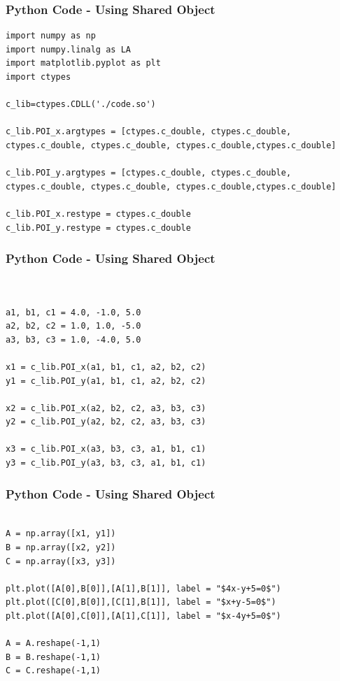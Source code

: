 \documentclass{beamer}
\begin{document}
\begin{frame}[fragile]
    \frametitle{Python Code - Using Shared Object}
    \begin{lstlisting}
import numpy as np
import numpy.linalg as LA
import matplotlib.pyplot as plt
import ctypes

c_lib=ctypes.CDLL('./code.so')

c_lib.POI_x.argtypes = [ctypes.c_double, ctypes.c_double, ctypes.c_double, ctypes.c_double, ctypes.c_double,ctypes.c_double]

c_lib.POI_y.argtypes = [ctypes.c_double, ctypes.c_double, ctypes.c_double, ctypes.c_double, ctypes.c_double,ctypes.c_double]

c_lib.POI_x.restype = ctypes.c_double
c_lib.POI_y.restype = ctypes.c_double

\end{lstlisting}
\end{frame}

\begin{frame}[fragile]
    \frametitle{Python Code - Using Shared Object}
    \begin{lstlisting}


a1, b1, c1 = 4.0, -1.0, 5.0
a2, b2, c2 = 1.0, 1.0, -5.0
a3, b3, c3 = 1.0, -4.0, 5.0

x1 = c_lib.POI_x(a1, b1, c1, a2, b2, c2)
y1 = c_lib.POI_y(a1, b1, c1, a2, b2, c2)

x2 = c_lib.POI_x(a2, b2, c2, a3, b3, c3)
y2 = c_lib.POI_y(a2, b2, c2, a3, b3, c3)

x3 = c_lib.POI_x(a3, b3, c3, a1, b1, c1)
y3 = c_lib.POI_y(a3, b3, c3, a1, b1, c1)

\end{lstlisting}
\end{frame}

\begin{frame}[fragile]
    \frametitle{Python Code - Using Shared Object}
    \begin{lstlisting}
    
A = np.array([x1, y1])
B = np.array([x2, y2])
C = np.array([x3, y3])

plt.plot([A[0],B[0]],[A[1],B[1]], label = "$4x-y+5=0$")
plt.plot([C[0],B[0]],[C[1],B[1]], label = "$x+y-5=0$")
plt.plot([A[0],C[0]],[A[1],C[1]], label = "$x-4y+5=0$")

A = A.reshape(-1,1)
B = B.reshape(-1,1)
C = C.reshape(-1,1)


\end{lstlisting}
\end{frame}
\end{document}
